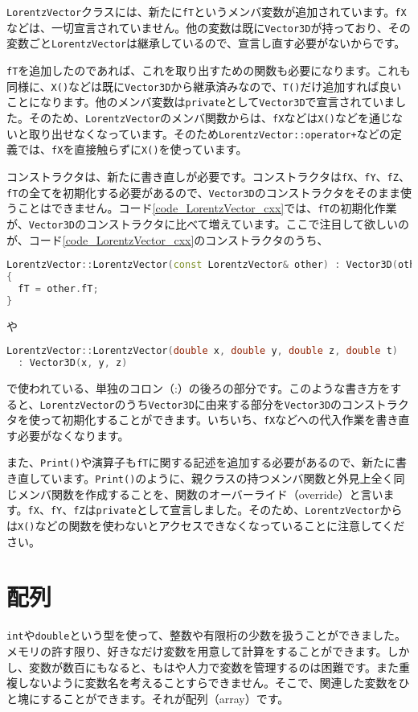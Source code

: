 \texttt{LorentzVector}クラスには、新たに\texttt{fT}というメンバ変数が追加されています。\texttt{fX}などは、一切宣言されていません。他の変数は既に\texttt{Vector3D}が持っており、その変数ごと\texttt{LorentzVector}は継承しているので、宣言し直す必要がないからです。

\texttt{fT}を追加したのであれば、これを取り出すための関数も必要になります。これも同様に、\texttt{X()}などは既に\texttt{Vector3D}から継承済みなので、\texttt{T()}だけ追加すれば良いことになります。他のメンバ変数は\texttt{private}として\texttt{Vector3D}で宣言されていました。そのため、\texttt{LorentzVector}のメンバ関数からは、\texttt{fX}などは\texttt{X()}などを通じないと取り出せなくなっています。そのため\texttt{LorentzVector::operator+}などの定義では、\texttt{fX}を直接触らずに\texttt{X()}を使っています。

コンストラクタは、新たに書き直しが必要です。コンストラクタは\texttt{fX}、\texttt{fY}、\texttt{fZ}、\texttt{fT}の全てを初期化する必要があるので、\texttt{Vector3D}のコンストラクタをそのまま使うことはできません。コード\ref{code_LorentzVector_cxx}では、\texttt{fT}の初期化作業が、\texttt{Vector3D}のコンストラクタに比べて増えています。ここで注目して欲しいのが、コード\ref{code_LorentzVector_cxx}のコンストラクタのうち、
\begin{lstlisting}[language=c++]
LorentzVector::LorentzVector(const LorentzVector& other) : Vector3D(other) 
{ 
  fT = other.fT; 
} 
\end{lstlisting}
や
\begin{lstlisting}[language=c++]
LorentzVector::LorentzVector(double x, double y, double z, double t) 
  : Vector3D(x, y, z) 
\end{lstlisting}
で使われている、単独のコロン（:）の後ろの部分です。このような書き方をすると、\texttt{LorentzVector}のうち\texttt{Vector3D}に由来する部分を\texttt{Vector3D}のコンストラクタを使って初期化することができます。いちいち、\texttt{fX}などへの代入作業を書き直す必要がなくなります。

また、\texttt{Print()}や演算子も\texttt{fT}に関する記述を追加する必要があるので、新たに書き直しています。\texttt{Print()}のように、親クラスの持つメンバ関数と外見上全く同じメンバ関数を作成することを、関数のオーバーライド（override）と言います。\texttt{fX}、\texttt{fY}、\texttt{fZ}は\texttt{private}として宣言しました。そのため、\texttt{LorentzVector}からは\texttt{X()}などの関数を使わないとアクセスできなくなっていることに注意してください。

\section{配列}
\label{sec:配列}
\texttt{int}や\texttt{double}という型を使って、整数や有限桁の少数を扱うことができました。メモリの許す限り、好きなだけ変数を用意して計算をすることができます。しかし、変数が数百にもなると、もはや人力で変数を管理するのは困難です。また重複しないように変数名を考えることすらできません。そこで、関連した変数をひと塊にすることができます。それが配列（array）です。

